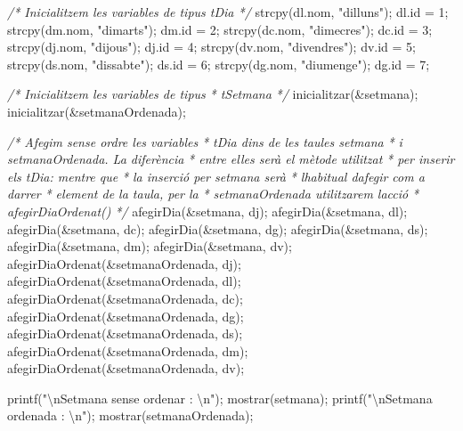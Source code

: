 \documentclass[]{book}
\newenvironment{Shaded}{\begin{snugshade}}{\end{snugshade}}
\newcommand{\CommentTok}[1]{\textcolor[rgb]{0.56,0.35,0.01}{\textit{#1}}}
\newcommand{\DecValTok}[1]{\textcolor[rgb]{0.00,0.00,0.81}{#1}}
\newcommand{\NormalTok}[1]{#1}
\newcommand{\SpecialCharTok}[1]{\textcolor[rgb]{0.00,0.00,0.00}{#1}}
\newcommand{\StringTok}[1]{\textcolor[rgb]{0.31,0.60,0.02}{#1}}
\begin{document}
\begin{Shaded}
\begin{Highlighting}[]
    \CommentTok{/* Inicialitzem les variables de tipus tDia */}
\NormalTok{    strcpy(dl.nom, }\StringTok{"dilluns"}\NormalTok{);}
\NormalTok{    dl.id = }\DecValTok{1}\NormalTok{;}
\NormalTok{    strcpy(dm.nom, }\StringTok{"dimarts"}\NormalTok{);}
\NormalTok{    dm.id = }\DecValTok{2}\NormalTok{;}
\NormalTok{    strcpy(dc.nom, }\StringTok{"dimecres"}\NormalTok{);}
\NormalTok{    dc.id = }\DecValTok{3}\NormalTok{;}
\NormalTok{    strcpy(dj.nom, }\StringTok{"dijous"}\NormalTok{);}
\NormalTok{    dj.id = }\DecValTok{4}\NormalTok{;}
\NormalTok{    strcpy(dv.nom, }\StringTok{"divendres"}\NormalTok{);}
\NormalTok{    dv.id = }\DecValTok{5}\NormalTok{;}
\NormalTok{    strcpy(ds.nom, }\StringTok{"dissabte"}\NormalTok{);}
\NormalTok{    ds.id = }\DecValTok{6}\NormalTok{;}
\NormalTok{    strcpy(dg.nom, }\StringTok{"diumenge"}\NormalTok{);}
\NormalTok{    dg.id = }\DecValTok{7}\NormalTok{;}
    
    \CommentTok{/* Inicialitzem les variables de tipus}
\CommentTok{     * tSetmana }
\CommentTok{     */}
\NormalTok{    inicialitzar(\&setmana);}
\NormalTok{    inicialitzar(\&setmanaOrdenada);}
    
    \CommentTok{/* Afegim sense ordre les variables}
\CommentTok{     * tDia dins de les taules setmana}
\CommentTok{     * i setmanaOrdenada. La diferència}
\CommentTok{     * entre elles serà el mètode utilitzat}
\CommentTok{     * per inserir els tDia: mentre que }
\CommentTok{     * la inserció per setmana serà }
\CommentTok{     * l\textquotesingle{}habitual d\textquotesingle{}afegir com a darrer}
\CommentTok{     * element de la taula, per la }
\CommentTok{     * setmanaOrdenada utilitzarem l\textquotesingle{}acció}
\CommentTok{     * afegirDiaOrdenat()}
\CommentTok{     */}
\NormalTok{    afegirDia(\&setmana, dj);}
\NormalTok{    afegirDia(\&setmana, dl);}
\NormalTok{    afegirDia(\&setmana, dc);}
\NormalTok{    afegirDia(\&setmana, dg);}
\NormalTok{    afegirDia(\&setmana, ds);}
\NormalTok{    afegirDia(\&setmana, dm);}
\NormalTok{    afegirDia(\&setmana, dv);}
\NormalTok{    afegirDiaOrdenat(\&setmanaOrdenada, dj);}
\NormalTok{    afegirDiaOrdenat(\&setmanaOrdenada, dl);    }
\NormalTok{    afegirDiaOrdenat(\&setmanaOrdenada, dc);}
\NormalTok{    afegirDiaOrdenat(\&setmanaOrdenada, dg);}
\NormalTok{    afegirDiaOrdenat(\&setmanaOrdenada, ds);}
\NormalTok{    afegirDiaOrdenat(\&setmanaOrdenada, dm);}
\NormalTok{    afegirDiaOrdenat(\&setmanaOrdenada, dv);}

\NormalTok{    printf(}\StringTok{"}\SpecialCharTok{\textbackslash{}n}\StringTok{Setmana sense ordenar : }\SpecialCharTok{\textbackslash{}n}\StringTok{"}\NormalTok{);}
\NormalTok{    mostrar(setmana);}
\NormalTok{    printf(}\StringTok{"}\SpecialCharTok{\textbackslash{}n}\StringTok{Setmana ordenada : }\SpecialCharTok{\textbackslash{}n}\StringTok{"}\NormalTok{);}
\NormalTok{    mostrar(setmanaOrdenada);}


\end{Highlighting}
\end{Shaded}
\end{document}
